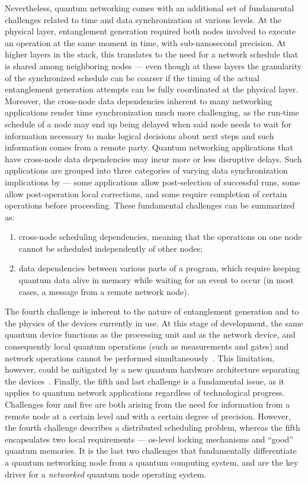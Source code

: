 Nevertheless, quantum networking comes with an additional set of fundamental challenges related to
time and data synchronization at various levels. At the physical layer, entanglement generation
required both nodes involved to execute an operation at the same moment in time, with sub-nanosecond
precision. At higher layers in the stack, this translates to the need for a network schedule that is
shared among neighboring nodes --- even though at these layers the granularity of the synchronized
schedule can be coarser if the timing of the actual entanglement generation attempts can be fully
coordinated at the physical layer. Moreover, the cross-node data dependencies inherent to many
networking applications render time synchronization much more challenging, as the run-time schedule
of a node may end up being delayed when said node needs to wait for information necessary to make
logical decisions about next steps and such information comes from a remote party. Quantum
networking applications that have cross-node data dependencies may incur more or less disruptive
delays. Such applications are grouped into three categories of varying data synchronization
implications by \textcite{van_meter_2017_timings} --- some applications allow post-selection of
successful runs, some allow post-operation local corrections, and some require completion of certain
operations before proceeding. These fundamental challenges can be summarized as:
%
\begin{enumerate}[resume]
    \item cross-node scheduling dependencies, meaning that the operations on one node cannot be
          scheduled independently of other nodes;
    \item data dependencies between various parts of a program, which require keeping quantum data
          alive in memory while waiting for an event to occur (in most cases, a message from a
          remote network node).
\end{enumerate}

The fourth challenge is inherent to the nature of entanglement generation and to the physics of the
devices currently in use. At this stage of development, the same quantum device functions as the
processing unit and as the network device, and consequently local quantum operations (such as
measurements and gates) and network operations cannot be performed
simultaneously~\cite{vardoyan_2019_performance}. This limitation, however, could be mitigated by a
new quantum hardware architecture separating the devices~\cite{vardoyan_2022_netarch}. Finally, the
fifth and last challenge is a fundamental issue, as it applies to quantum network applications
regardless of technological progress. Challenges four and five are both arising from the need for
information from a remote node at a certain level and with a certain degree of precision. However,
the fourth challenge describes a distributed scheduling problem, whereas the fifth encapsulates two
local requirements --- \acrshort{os}-level locking mechanisms and ``good'' quantum memories. It is
the last two challenges that fundamentally differentiate a quantum networking node from a quantum
computing system, and are the key driver for a \emph{networked} quantum node operating system.

